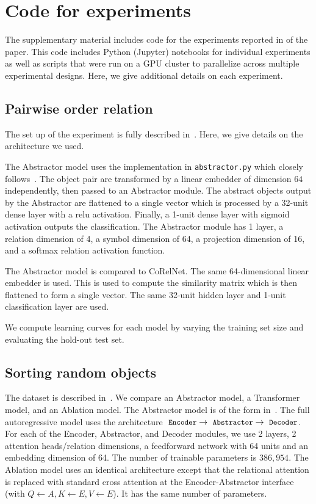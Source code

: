 \section{Code for experiments}
\label{sec:code}

The supplementary material includes code for the experiments reported in  of the paper. This code includes Python (Jupyter) notebooks for individual experiments as well as scripts that were run on a GPU cluster to parallelize across multiple experimental designs. Here, we give additional details on each experiment.

\subsection{Pairwise order relation}
The set up of the experiment is fully described in~. Here, we give details on the architecture we used.

The Abstractor model uses the implementation in \texttt{abstractor.py} which closely follows~. The object pair are transformed by a linear embedder of dimension $64$ independently, then passed to an Abstractor module. The abstract objects output by the Abstractor are flattened to a single vector which is processed by a 32-unit dense layer with a relu activation. Finally, a 1-unit dense layer with sigmoid activation outputs the classification. The Abstractor module has 1 layer, a relation dimension of 4, a symbol dimension of 64, a projection dimension of 16, and a softmax relation activation function.

The Abstractor model is compared to CoRelNet. The same 64-dimensional linear embedder is used. This is used to compute the similarity matrix which is then flattened to form a single vector. The same 32-unit hidden layer and 1-unit classification layer are used.

We compute learning curves for each model by varying the training set size and evaluating the hold-out test set.

\subsection{Sorting random objects}

The dataset is described in~. We compare an Abstractor model, a Transformer model, and an Ablation model. The Abstractor model is of the form in~. The full autoregressive model uses the architecture $\module{Encoder} \to \module{Abstractor} \to \module{Decoder}$. For each of the Encoder, Abstractor, and Decoder modules, we use 2 layers, 2 attention heads/relation dimensions, a feedforward network with 64 units and an embedding dimension of 64. The number of trainable parameters is $386,954$. The Ablation model uses an identical architecture except that the relational attention is replaced with standard cross attention at the Encoder-Abstractor interface (with $Q \gets A, K \gets E, V \gets E$). It has the same number of parameters.

